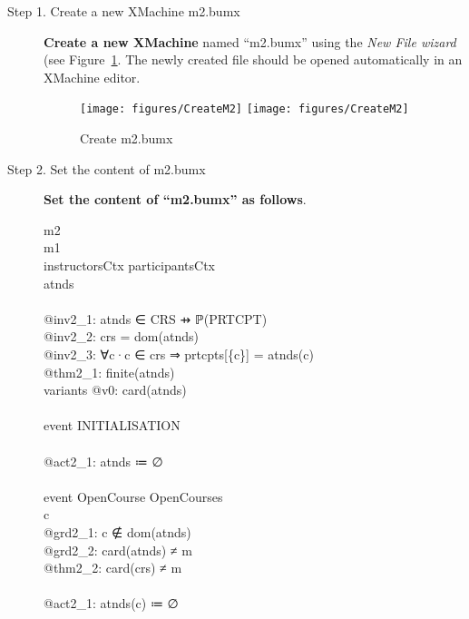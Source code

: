 \begin{description}
\item[Step 1. Create a new XMachine m2.bumx] \textbf{Create a new XMachine} named ``m2.bumx'' using the \emph{New File wizard} (see Figure~\ref{fig:CreateM2}. The newly created file should be opened automatically in an XMachine editor.
  \begin{figure}[!htbp]
    \centering
    \texttt{[image: figures/CreateM2]}
    \else
    \texttt{[image: figures/CreateM2]}
    \endif
    \caption{Create m2.bumx}
    \label{fig:CreateM2}
  \end{figure}

\item[Step 2. Set the content of m2.bumx] \textbf{Set the content of ``m2.bumx'' as follows}.
  \begin{center}
    \begin{Bcode}
      \Bmachine{} m2\\
      \Brefines{} m1\\
      \Bsees{} instructorsCtx participantsCtx\\
      \Bvariables{} atnds\\
      \Binvariants\\
      @inv2_1: atnds ∈ CRS ⇸ ℙ(PRTCPT)\\
      @inv2_2: crs = dom(atnds)\\
      @inv2_3: ∀c·c ∈ crs ⇒ prtcpts[\{c\}] = atnds(c)\\
      \Btheorem{} @thm2_1: finite(atnds)\\
      variants @v0: card(atnds)\\
      \Bevents\\
      event INITIALISATION\\
      \Bthen \\
      @act2_1: atnds ≔ ∅\\
      \Bend\\
      event OpenCourse \Brefines{} OpenCourses\\
      \Bany{} c \Bwhere\\
      @grd2_1: c ∉ dom(atnds)\\
      @grd2_2: card(atnds) ≠ m \\
      \Btheorem{} @thm2_2: card(crs) ≠ m\\
      \Bthen\\
      @act2_1: atnds(c) ≔ ∅\\
      \Bwith\\

\end{Bcode}
\end{center}
\end{description}
